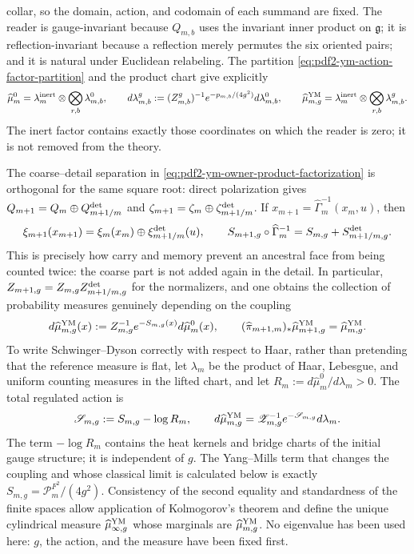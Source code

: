 collar, so the domain, action, and codomain of each summand are fixed.
The reader is gauge-invariant because $Q_{m,b}$ uses the invariant inner product on
$\mathfrak g$; it is reflection-invariant because a reflection merely permutes the
six oriented pairs; and it is natural under Euclidean relabeling.
The partition \eqref{eq:pdf2-ym-action-factor-partition} and the product chart give
explicitly
\begin{equation}\label{eq:pdf2-ym-action-factor-measures}
 \widehat\mu_m^0=\lambda_m^{\rm inert}\otimes
   \bigotimes_{r,b}\lambda_{m,b}^0,
 \qquad
 d\lambda_{m,b}^g
 :=(Z_{m,b}^g)^{-1}e^{-p_{m,b}/(4g^2)}d\lambda_{m,b}^0,
 \qquad
 \widehat\mu_{m,g}^{\rm YM}=\lambda_m^{\rm inert}\otimes
   \bigotimes_{r,b}\lambda_{m,b}^g.
\end{equation}
The inert factor contains exactly those coordinates on which the reader is
zero; it is not removed from the theory.

The coarse--detail separation in
\eqref{eq:pdf2-ym-owner-product-factorization} is orthogonal for the same square root:
direct polarization gives
$Q_{m+1}=Q_m\oplus Q_{m+1/m}^{\rm det}$ and
$\zeta_{m+1}=\zeta_m\oplus\zeta_{m+1/m}^{\rm det}$.
If $x_{m+1}=\widehat\Gamma_m^{-1}(x_m,u)$, then
\begin{equation}\label{eq:pdf2-ym-action-cocycle}
 \xi_{m+1}(x_{m+1})
 =\xi_m(x_m)\oplus\xi_{m+1/m}^{\rm det}(u),
 \qquad
 S_{m+1,g}\circ\widehat\Gamma_m^{-1}
 =S_{m,g}+S_{m+1/m,g}^{\rm det}.
\end{equation}
This is precisely how carry and memory prevent an ancestral face from being counted
twice: the coarse part is not added again in the detail. In particular,
$Z_{m+1,g}=Z_{m,g}Z_{m+1/m,g}^{\rm det}$ for the normalizers, and one obtains the
collection of probability measures genuinely depending on the coupling
\begin{equation}\label{eq:pdf2-ym-gibbs-measure}
 d\widehat\mu_{m,g}^{\rm YM}(x)
 :=Z_{m,g}^{-1}e^{-S_{m,g}(x)}d\widehat\mu_m^0(x),
 \qquad
 (\widehat\pi_{m+1,m})_*\widehat\mu_{m+1,g}^{\rm YM}
 =\widehat\mu_{m,g}^{\rm YM}.
\end{equation}
To write Schwinger--Dyson correctly with respect to Haar, rather than pretending that the
reference measure is flat, let $\lambda_m$ be the product of Haar, Lebesgue, and
uniform counting measures in the lifted chart, and let
$R_m:=d\widehat\mu_m^0/d\lambda_m>0$. The total regulated action is
\begin{equation}\label{eq:pdf2-ym-total-regulated-action}
 \mathscr S_{m,g}:=S_{m,g}-\log R_m,
 \qquad
 d\widehat\mu_{m,g}^{\rm YM}
 =\mathscr Z_{m,g}^{-1}e^{-\mathscr S_{m,g}}d\lambda_m.
\end{equation}
The term $-\log R_m$ contains the heat kernels and bridge charts of the
initial gauge structure; it is independent of $g$. The Yang--Mills term that
changes the coupling and whose classical limit is calculated below is exactly
$S_{m,g}=\mathcal P_m^{F^2}/(4g^2)$.
Consistency of the second equality and standardness of the finite spaces
allow application of Kolmogorov's theorem and define the unique cylindrical measure
$\widehat\mu_{\infty,g}^{\rm YM}$ whose marginals are
$\widehat\mu_{m,g}^{\rm YM}$.
No eigenvalue has been used here: $g$, the action, and
the measure have been fixed first.

